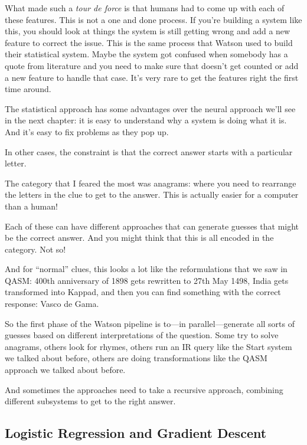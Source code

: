What made \watson{} such a \textit{tour de force} is that humans had to come
up with each of these features.
%
This is not a one and done process.  If you're building a system like
this, you should look at things the system is still getting wrong and
add a new feature to correct the issue.  This is the same process that
Watson used to build their statistical system.  Maybe the system got
confused when somebody has a quote from literature and you need to
make sure that doesn’t get counted or add a new feature to handle that
case.  It’s very rare to get the features right the first time around.



The statistical approach has some advantages over the neural approach
we'll see in the next chapter: it is easy to understand why a system
is doing what it is.  And it's easy to fix problems as they pop up.


In other cases, the constraint is that the correct answer starts with a particular letter.  

The category that I feared the most was anagrams: where you need to rearrange the letters in the clue to get to the answer.  This is actually easier for a computer than a human!

Each of these can have different approaches that can generate guesses that
might be the correct answer.  And you might think that this is all encoded in
the category.  Not so!

And for “normal” clues, this looks a lot like the reformulations that we saw in QASM: 400th anniversary of 1898 gets rewritten to 27th May 1498, India gets transformed into Kappad, and then you can find something with the correct response: Vasco de Gama.

So the first phase of the Watson pipeline is to---in parallel---generate all
sorts of guesses based on different interpretations of the question.  Some try
to solve anagrams, others look for rhymes, others run an IR query like the
Start system we talked about before, others are doing transformations like the
QASM approach we talked about before.

And sometimes the approaches need to take a recursive approach, combining
different subsystems to get to the right answer.

\subsection{Logistic Regression and Gradient Descent}
\label{sec:logistic-regression}

